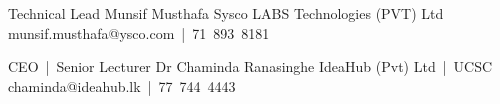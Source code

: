 

\begin{cventries}

    \cventry
    {Technical Lead} %
    {Munsif Musthafa} %
    {Sysco LABS Technologies (PVT) Ltd} %
    {munsif.musthafa@ysco.com~|~71~893~8181} %
    {
    }
    
    
    
    \cventry
    {CEO~|~Senior Lecturer} %
    {Dr Chaminda Ranasinghe} %
    {IdeaHub (Pvt) Ltd~|~UCSC} %
    {chaminda@ideahub.lk~|~77~744~4443} %
    {
    }



\end{cventries}
